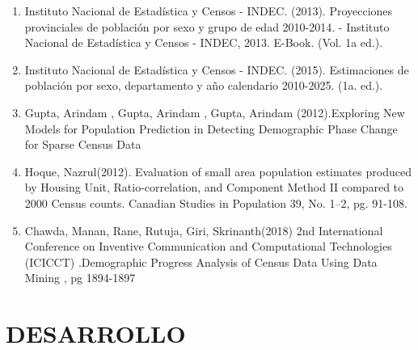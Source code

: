 \documentclass{article}
\theoremstyle{mytheoremstyle}
\theoremstyle{mytheoremstyle}
\theoremstyle{myproblemstyle}
\begin{document}
\begin{enumerate}
  \item  Instituto Nacional de Estadística y Censos - INDEC. (2013). Proyecciones provinciales de población por sexo y grupo de edad 2010-2014. - Instituto Nacional de Estadística y Censos - INDEC, 2013. E-Book. (Vol. 1a ed.).
  \item  Instituto Nacional de Estadística y Censos - INDEC. (2015). Estimaciones de población por sexo, departamento y año calendario 2010-2025. (1a. ed.).
  \item Gupta, Arindam , Gupta, Arindam , Gupta, Arindam  (2012).Exploring New Models for Population Prediction in Detecting Demographic Phase Change for Sparse Census Data
  \item  Hoque, Nazrul(2012). Evaluation of small area population estimates produced by Housing Unit, Ratio-correlation, and Component Method II compared to 2000 Census counts. Canadian Studies in Population 39, No. 1–2,  pg. 91-108.
  \item Chawda, Manan, Rane, Rutuja, Giri, Skrinanth(2018) 2nd International Conference on Inventive Communication and Computational Technologies (ICICCT) .Demographic Progress Analysis of Census Data Using Data Mining , pg 1894-1897
 \end{enumerate}
 \section{DESARROLLO}
\end{document}

